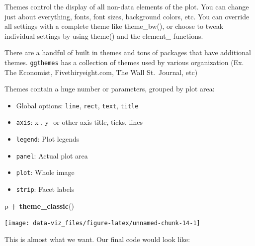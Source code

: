 \documentclass[]{book}
\newenvironment{Shaded}{\begin{snugshade}}{\end{snugshade}}
\newcommand{\KeywordTok}[1]{\textcolor[rgb]{0.13,0.29,0.53}{\textbf{#1}}}
\newcommand{\NormalTok}[1]{#1}
\newcommand{\OperatorTok}[1]{\textcolor[rgb]{0.81,0.36,0.00}{\textbf{#1}}}
\newcommand{\StringTok}[1]{\textcolor[rgb]{0.31,0.60,0.02}{#1}}
\providecommand{\tightlist}{%
  \setlength{\itemsep}{0pt}\setlength{\parskip}{0pt}}
\theoremstyle{definition}
\theoremstyle{definition}
\theoremstyle{definition}
\theoremstyle{remark}
\begin{document}
Themes control the display of all non-data elements of the plot. You can
change just about everything, fonts, font sizes, background colors, etc.
You can override all settings with a complete theme like theme\_bw(), or
choose to tweak individual settings by using theme() and the element\_
functions.

There are a handful of built in themes and tons of packages that have
additional themes. \texttt{ggthemes} has a collection of themes used by
various organization (Ex. The Economist, Fivethiryeight.com, The Wall
St.~Journal, etc)

Themes contain a huge number or parameters, grouped by plot area:

\begin{itemize}
\tightlist
\item
  Global options: \texttt{line}, \texttt{rect}, \texttt{text},
  \texttt{title}
\item
  \texttt{axis}: x-, y- or other axis title, ticks, lines
\item
  \texttt{legend}: Plot legends
\item
  \texttt{panel}: Actual plot area
\item
  \texttt{plot}: Whole image
\item
  \texttt{strip}: Facet labels
\end{itemize}

\begin{Shaded}
\begin{Highlighting}[]
\NormalTok{p }\OperatorTok{+}\StringTok{ }\KeywordTok{theme_classic}\NormalTok{()}
\end{Highlighting}
\end{Shaded}

\begin{center}\texttt{[image: data-viz\_files/figure-latex/unnamed-chunk-14-1]} \end{center}

This is almost what we want. Our final code would look like:
\end{document}
